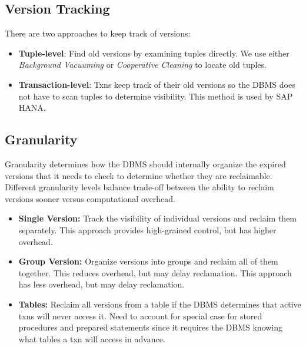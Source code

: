 \documentclass[11pt]{article}
\begin{document}
\subsection*{Version Tracking}
There are two approaches to keep track of versions:
\begin{itemize}
    \item \textbf{Tuple-level}: Find old versions by examining tuples directly. We use either \textit{Background Vacuuming} or \textit{Cooperative Cleaning} to locate old tuples.
    \item \textbf{Transaction-level}: Txns keep track of their old versions so the DBMS does not have to scan tuples to determine visibility. This method is used by SAP HANA.
\end{itemize}

\subsection*{Granularity}
Granularity determines how the DBMS should internally organize the expired versions that it needs to check to determine whether they are reclaimable. Different granularity levels balance trade-off between the ability to reclaim versions sooner versus computational overhead.
\begin{itemize}
    \item \textbf{Single Version:} Track the visibility of individual versions and reclaim them separately. This approach provides high-grained control, but has higher overhead.
    \item \textbf{Group Version:} Organize versions into groups and reclaim all of them together. This reduces overhead, but may delay reclamation. This approach has less overhead, but may delay reclamation.
    \item \textbf{Tables:} Reclaim all versions from a table if the DBMS determines that active txns will never access it. Need to account for special case for stored procedures and prepared statements since it requires the DBMS knowing what tables a txn will access in advance.

\end{itemize}

\end{document}
